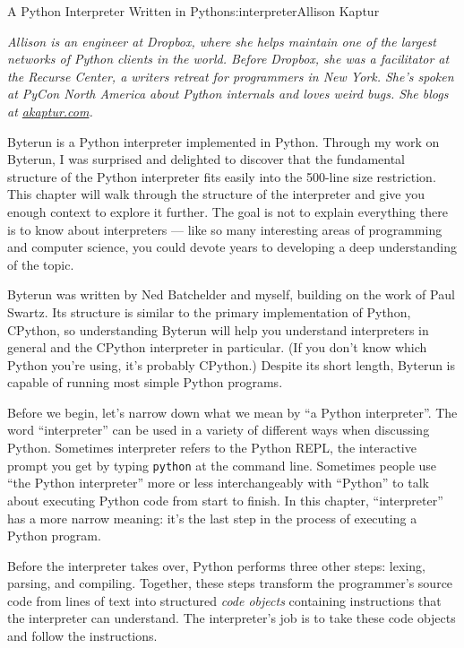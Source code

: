 \begin{aosachapter}{A Python Interpreter Written in Python}{s:interpreter}{Allison Kaptur}

\emph{Allison is an engineer at Dropbox, where she helps maintain one of
the largest networks of Python clients in the world. Before Dropbox, she
was a facilitator at the Recurse Center, a writers retreat for
programmers in New York. She's spoken at PyCon North America about
Python internals and loves weird bugs. She blogs at
\href{http://akaptur.com}{akaptur.com}.}

\label{introduction}

Byterun is a Python interpreter implemented in Python. Through my work
on Byterun, I was surprised and delighted to discover that the
fundamental structure of the Python interpreter fits easily into the
500-line size restriction. This chapter will walk through the structure
of the interpreter and give you enough context to explore it further.
The goal is not to explain everything there is to know about
interpreters --- like so many interesting areas of programming and
computer science, you could devote years to developing a deep
understanding of the topic.

Byterun was written by Ned Batchelder and myself, building on the work
of Paul Swartz. Its structure is similar to the primary implementation
of Python, CPython, so understanding Byterun will help you understand
interpreters in general and the CPython interpreter in particular. (If
you don't know which Python you're using, it's probably CPython.)
Despite its short length, Byterun is capable of running most simple
Python programs.

\label{a-python-interpreter}

Before we begin, let's narrow down what we mean by ``a Python
interpreter''. The word ``interpreter'' can be used in a variety of
different ways when discussing Python. Sometimes interpreter refers to
the Python REPL, the interactive prompt you get by typing
\texttt{python} at the command line. Sometimes people use ``the Python
interpreter'' more or less interchangeably with ``Python'' to talk about
executing Python code from start to finish. In this chapter,
``interpreter'' has a more narrow meaning: it's the last step in the
process of executing a Python program.

Before the interpreter takes over, Python performs three other steps:
lexing, parsing, and compiling. Together, these steps transform the
programmer's source code from lines of text into structured \emph{code
objects} containing instructions that the interpreter can understand.
The interpreter's job is to take these code objects and follow the
instructions.


\end{aosachapter}
